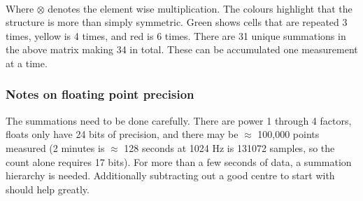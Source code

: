 \documentclass{article}
\begin{document}
\\
Where $\otimes$ denotes the element wise multiplication. The 
colours highlight that the structure is more
than simply symmetric. Green shows cells that are repeated 3 times,
yellow is 4 times, and red is 6 times. There are 31 unique summations
in the above matrix making 34 in total. These can be accumulated
one measurement at a time.
%
\subsubsection*{Notes on floating point precision}
The summations need to be done carefully. There are power 1 through
4 factors, floats only have 24 bits of precision, and there may be
$\approx$ 100,000 points measured (2 minutes is $\approx$ 128 seconds at 1024 Hz is
131072 samples, so the count alone requires 17 bits). For more than a
few seconds of data, a summation hierarchy is needed. Additionally 
subtracting out a good centre to start with should help greatly.
%
\end{document}
